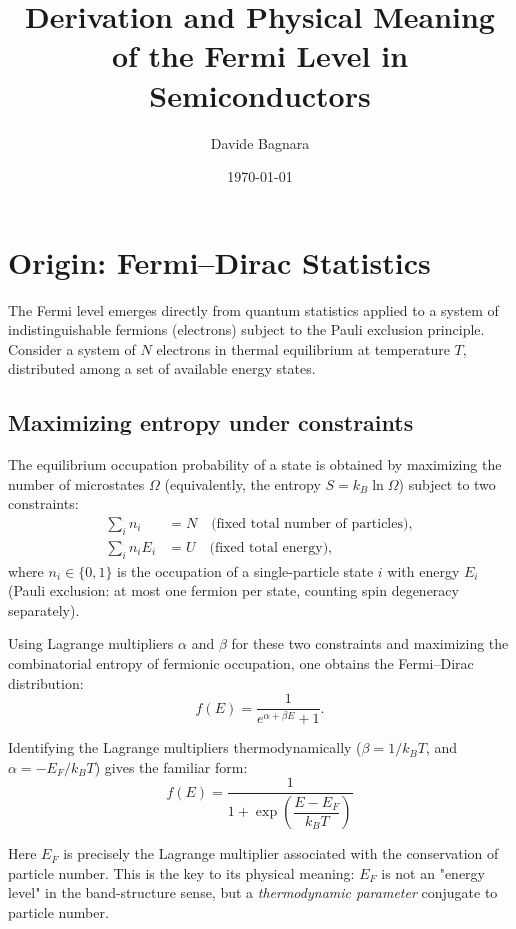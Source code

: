 \documentclass[11pt]{article}
\title{Derivation and Physical Meaning of the Fermi Level in Semiconductors}
\author{Davide Bagnara}
\date{\today}
\begin{document}
\maketitle

\section{Origin: Fermi--Dirac Statistics}

The Fermi level emerges directly from quantum statistics applied to a system of indistinguishable fermions (electrons) subject to the Pauli exclusion principle. Consider a system of $N$ electrons in thermal equilibrium at temperature $T$, distributed among a set of available energy states.

\subsection{Maximizing entropy under constraints}

The equilibrium occupation probability of a state is obtained by maximizing the number of microstates $\Omega$ (equivalently, the entropy $S = k_B \ln \Omega$) subject to two constraints:
\begin{align}
\sum_i n_i &= N \quad \text{(fixed total number of particles)}, \\
\sum_i n_i E_i &= U \quad \text{(fixed total energy)},
\end{align}
where $n_i \in \{0,1\}$ is the occupation of a single-particle state $i$ with energy $E_i$ (Pauli exclusion: at most one fermion per state, counting spin degeneracy separately).

Using Lagrange multipliers $\alpha$ and $\beta$ for these two constraints and maximizing the combinatorial entropy of fermionic occupation, one obtains the Fermi--Dirac distribution:
\begin{equation}
f(E) = \frac{1}{e^{\alpha + \beta E} + 1}.
\end{equation}

Identifying the Lagrange multipliers thermodynamically ($\beta = 1/k_BT$, and $\alpha = -E_F/k_BT$) gives the familiar form:
\begin{equation}
\boxed{f(E) = \frac{1}{1 + \exp\!\left(\dfrac{E - E_F}{k_BT}\right)}}
\end{equation}

Here $E_F$ is precisely the Lagrange multiplier associated with the conservation of particle number. This is the key to its physical meaning: $E_F$ is not an "energy level" in the band-structure sense, but a \emph{thermodynamic parameter} conjugate to particle number.
\end{document}
